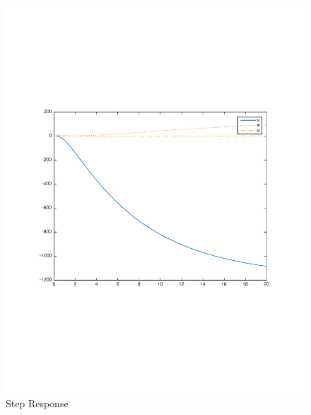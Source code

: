 \documentclass[12pt]{article}
\begin{document}
\begin{figure}[h]
\begin{center}
\includegraphics[width=1\textwidth]{figures/uwq}
\caption{Step Response}
\end{center}
\end{figure}
\end{document}
